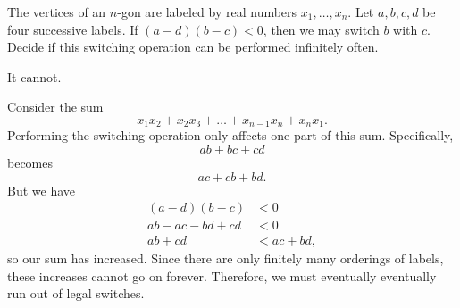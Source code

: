 \begin{problem}
The vertices of an $n$-gon are labeled by real numbers $x_1, \dots, x_n$. Let $a, b, c, d$ be four successive labels. If $(a - d)(b - c) < 0$, then we may switch $b$ with $c$. Decide if this switching operation can be performed infinitely often.
\end{problem}

It cannot.

Consider the sum $$x_1x_2 + x_2x_3 + \dots + x_{n-1}x_n + x_nx_1.$$ Performing the switching operation only affects one part of this sum. Specifically, $$ab + bc + cd$$ becomes $$ac + cb + bd.$$ But we have
\begin{align*}
(a-d)(b-c) &< 0 \\
ab - ac - bd + cd &< 0 \\
ab + cd &< ac + bd,
\end{align*}
so our sum has increased. Since there are only finitely many orderings of labels, these increases cannot go on forever. Therefore, we must eventually eventually run out of legal switches.